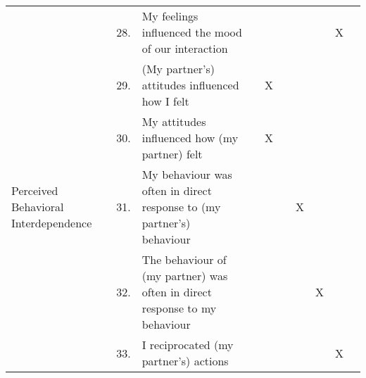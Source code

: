 \begin{table}[h]
\begin{tabular}{@{}lcl|ccccccc@{}}
                                     & 28.      & My feelings influenced the mood of our interaction                         &                                                              &          &                                                              &         &                                                           & X     &                                                           \\
                                     & 29.      & (My partner's) attitudes influenced how I felt                             &                                                              & X        &                                                              &         &                                                           &       &                                                           \\
                                     & 30.      & My attitudes influenced how (my partner) felt                              &                                                              & X        &                                                              &         &                                                           &       &                                                           \\ \midrule
Perceived Behavioral Interdependence & 31.      & My behaviour was often in direct response to (my partner's) behaviour      &                                                              &          &                                                              & X       &                                                           &       &                                                           \\
                                     & 32.      & The behaviour of (my partner) was often in direct response to my behaviour &                                                              &          &                                                              &         & X                                                         &       &                                                           \\
                                     & 33.      & I reciprocated (my partner's) actions                                      &                                                              &          &                                                              &         &                                                           & X     &                                                           \\

\end{tabular}
\end{table}
